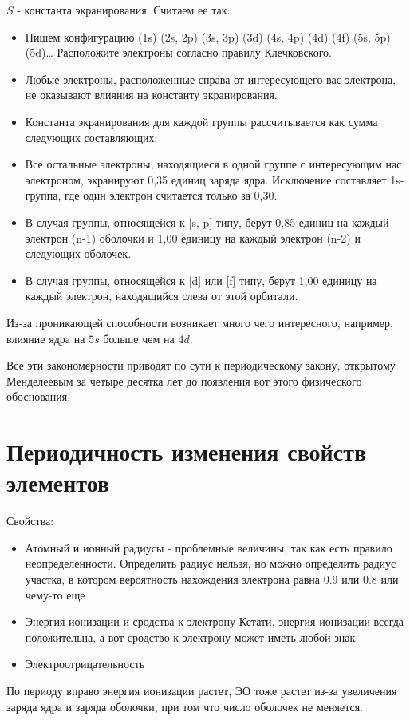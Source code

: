\documentclass[11pt]{article}
\begin{document}
$S$ - константа экранирования.
Считаем ее так:
\begin{itemize}
\item Пишем конфигурацию
(1s) (2s, 2p) (3s, 3p) (3d) (4s, 4p) (4d) (4f) (5s, 5p) (5d)…
Расположите электроны согласно правилу Клечковского.
\item Любые электроны, расположенные справа от интересующего вас электрона, не оказывают влияния на константу экранирования.
\item Константа экранирования для каждой группы рассчитывается как сумма следующих составляющих:
\item Все остальные электроны, находящиеся в одной группе с интересующим нас электроном, экранируют 0,35 единиц заряда ядра. Исключение составляет 1s-группа, где один электрон считается только за 0,30.
\item В случая группы, относящейся к [s, p] типу, берут 0,85 единиц на каждый электрон (n-1) оболочки и 1,00 единицу на каждый электрон (n-2) и следующих оболочек.
\item В случая группы, относящейся к [d] или [f] типу, берут 1,00 единицу на каждый электрон, находящийся слева от этой орбитали.
\end{itemize}

Из-за проникающей способности возникает много чего интересного, например, влияние ядра на $5s$ больше чем на $4d$.

Все эти закономерности приводят по сути к периодическому закону, открытому Менделеевым за четыре десятка лет до появления вот этого физического обоснования.

\section*{Периодичность изменения свойств элементов}
Свойства:
\begin{itemize}
\item Атомный и ионный радиусы - проблемные величины, так как есть правило неопределенности. Определить радиус нельзя, но можно определить радиус участка, в котором вероятность нахождения электрона равна 0.9 или 0.8 или чему-то еще
\item Энергия ионизации и сродства к электрону
Кстати, энергия ионизации всегда положительна, а вот сродство к электрону может иметь любой знак
\item Электроотрицательность
\end{itemize}

По периоду вправо энергия ионизации растет, ЭО тоже растет из-за увеличения заряда ядра и заряда оболочки, при том что число оболочек не меняется.
\end{document}
